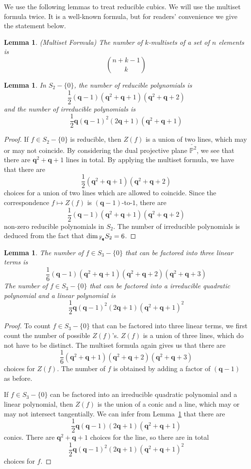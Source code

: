 \documentclass[12pt]{article}
\theoremstyle{plain}
\newtheorem{lemma}[equation]{Lemma}
\theoremstyle{definition}
\newcommand{\IF}{\mathbb{F}}
\newcommand{\IP}{\mathbb{P}}
\renewcommand\dim{{\rm dim\,}}
\newcommand{\<}{\langle}
\renewcommand{\>}{\rangle}
\begin{document}
We use the following lemmas to treat reducible cubics. We will use the multiset formula twice. It is a well-known formula, but for readers' convenience we give the statement below. 
\begin{lemma}
\emph{(Multiset Formula)}
The number of $k$-multisets of a set of $n$ elements is 
$$ {n + k - 1 \choose k} $$
\end{lemma}

\begin{lemma}
\label{countquadratic}
In $S_2 - \{0\}$, the number of reducible polynomials is
$$ \frac{1}{2}(\pmb{q} - 1)(\pmb{q}^2 + \pmb{q} + 1)(\pmb{q}^2 + \pmb{q} + 2) $$
and the number of irreducible polynomials is 
$$ \frac{1}{2} \pmb{q}(\pmb{q} - 1)^2 (2\pmb{q} + 1) (\pmb{q}^2 + \pmb{q} + 1) $$
\end{lemma}
\begin{proof}
If $f \in S_2 - \{0\}$ is reducible, then $Z(f)$ is a union of two lines, which may or may not coincide. By considering the dual projective plane $\check{\IP^2}$, we see that there are $\pmb{q}^2 + \pmb{q} + 1$ lines in total. By applying the multiset formula, we have that there are 
$$ \frac{1}{2}(\pmb{q}^2 + \pmb{q} + 1)(\pmb{q}^2 + \pmb{q} + 2)  $$
choices for a union of two lines which are allowed to coincide. 
Since the correspondence $f \mapsto Z(f)$ is $(\pmb{q} - 1)$-to-$1$, there are
$$ \frac{1}{2}(\pmb{q} - 1)(\pmb{q}^2 + \pmb{q} + 1)(\pmb{q}^2 + \pmb{q} + 2) $$
non-zero reducible polynomials in $S_2$. The number of irreducible polynomials is deduced from the fact that $\dim_{\IF_{\pmb{q}}} S_2 = 6$. 
\end{proof}

\begin{lemma}
The number of $f \in S_3 - \{0\}$ that can be factored into three linear terms is 
$$ \frac{1}{6} (\pmb{q} - 1) (\pmb{q}^2 + \pmb{q} + 1) (\pmb{q}^2 + \pmb{q} + 2) (\pmb{q}^2 + \pmb{q} + 3)$$ 
The number of $f \in S_3 - \{0\}$ that can be factored into a irreducible quadratic polynomial and a linear polynomial is 
$$  \frac{1}{2} \pmb{q}(\pmb{q} - 1)^2(2\pmb{q} + 1) (\pmb{q}^2 + \pmb{q} + 1)^2 $$
\end{lemma}
\begin{proof}
To count $f \in S_3 - \{0\}$ that can be factored into three linear terms, we first count the number of possible $Z(f)$'s. $Z(f)$ is a union of three lines, which do not have to be distinct. The multiset formula again gives us that there are 
$$ \frac{1}{6} (\pmb{q}^2 + \pmb{q} + 1) (\pmb{q}^2 + \pmb{q} + 2) (\pmb{q}^2 + \pmb{q} + 3) $$
choices for $Z(f)$. The number of $f$ is obtained by adding a factor of $(\pmb{q} - 1)$ as before.

If $f \in S_3 - \{0\}$ can be factored into an irreducible quadratic polynomial and a linear polynomial, then $Z(f)$ is the union of a conic and a line, which may or may not intersect tangentially. We can infer from Lemma~\ref{countquadratic} that there are 
$$ \frac{1}{2} \pmb{q}(\pmb{q} - 1)(2\pmb{q} + 1) (\pmb{q}^2 + \pmb{q} + 1) $$
conics. There are $\pmb{q}^2 + \pmb{q}  + 1$ choices for the line, so there are in total
$$  \frac{1}{2} \pmb{q}(\pmb{q} - 1)^2(2\pmb{q} + 1) (\pmb{q}^2 + \pmb{q} + 1)^2 $$
choices for $f$. 
\end{proof}
\end{document}
